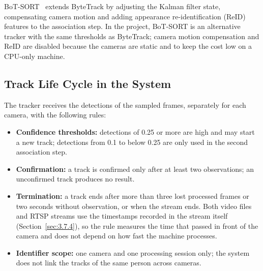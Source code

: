 BoT-SORT~\cite{aharon2022botsort} extends ByteTrack by adjusting the Kalman filter state, compensating camera motion and adding appearance re-identification (ReID) features to the association step. In the project, BoT-SORT is an alternative tracker with the same thresholds as ByteTrack; camera motion compensation and ReID are disabled because the cameras are static and to keep the cost low on a CPU-only machine.

\subsection{Track Life Cycle in the System}
\label{sec:3.3.5}

The tracker receives the detections of the sampled frames, separately for each camera, with the following rules:
\begin{itemize}
    \item \textbf{Confidence thresholds:} detections of 0.25 or more are high and may start a new track; detections from 0.1 to below 0.25 are only used in the second association step.
    \item \textbf{Confirmation:} a track is confirmed only after at least two observations; an unconfirmed track produces no result.
    \item \textbf{Termination:} a track ends after more than three lost processed frames or two seconds without observation, or when the stream ends. Both video files and RTSP streams use the timestamps recorded in the stream itself (Section~\ref{sec:3.7.4}), so the rule measures the time that passed in front of the camera and does not depend on how fast the machine processes.
    \item \textbf{Identifier scope:} one camera and one processing session only; the system does not link the tracks of the same person across cameras.
\end{itemize}
